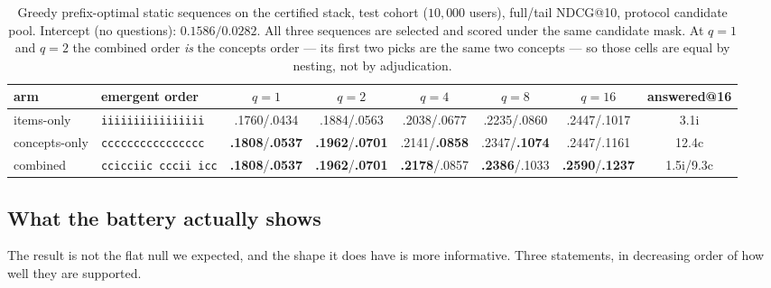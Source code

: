 \documentclass[11pt]{article}
\begin{document}
\begin{table}[t]
\centering
\caption{Greedy prefix-optimal static sequences on the certified stack, test cohort
($10{,}000$ users), full/tail NDCG@10, protocol candidate pool. Intercept (no questions):
$0.1586/0.0282$. All three sequences are selected and scored under the same candidate mask. At
$q{=}1$ and $q{=}2$ the combined order \emph{is} the concepts order --- its first two picks are the
same two concepts --- so those cells are equal by nesting, not by adjudication.}
\label{tab:greedy}
\footnotesize
\setlength{\tabcolsep}{1.4pt}
\begin{tabular}{llccccc c}
\toprule
arm & emergent order & $q{=}1$ & $q{=}2$ & $q{=}4$ & $q{=}8$ & $q{=}16$ & answered@16 \\
\midrule
items-only & \texttt{iiiiiiiiiiiiiiii} & .1760/.0434 & .1884/.0563 & .2038/.0677 & .2235/.0860 & .2447/.1017 & 3.1i \\
concepts-only & \texttt{cccccccccccccccc} & \textbf{.1808}/\textbf{.0537} & \textbf{.1962}/\textbf{.0701} & .2141/\textbf{.0858} & .2347/\textbf{.1074} & .2447/.1161 & 12.4c \\
combined & \texttt{ccicciic\,cccii\,icc} & \textbf{.1808}/\textbf{.0537} & \textbf{.1962}/\textbf{.0701} & \textbf{.2178}/.0857 & \textbf{.2386}/.1033 & \textbf{.2590}/\textbf{.1237} & 1.5i/9.3c \\
\bottomrule
\end{tabular}
\end{table}

\subsection{What the battery actually shows}
\label{sec:act1result}

The result is not the flat null we expected, and the shape it does have is more informative. Three
statements, in decreasing order of how well they are supported.
\end{document}
